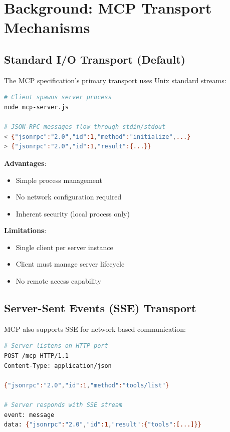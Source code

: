 \documentclass[11pt,letterpaper]{article}
\begin{document}
\section{Background: MCP Transport Mechanisms}

\subsection{Standard I/O Transport (Default)}

The MCP specification's primary transport uses Unix standard streams:

\begin{lstlisting}[language=bash,caption={Stdio MCP Communication}]
# Client spawns server process
node mcp-server.js

# JSON-RPC messages flow through stdin/stdout
< {"jsonrpc":"2.0","id":1,"method":"initialize",...}
> {"jsonrpc":"2.0","id":1,"result":{...}}
\end{lstlisting}

\textbf{Advantages}:
\begin{itemize}[noitemsep]
    \item Simple process management
    \item No network configuration required
    \item Inherent security (local process only)
\end{itemize}

\textbf{Limitations}:
\begin{itemize}[noitemsep]
    \item Single client per server instance
    \item Client must manage server lifecycle
    \item No remote access capability
\end{itemize}

\subsection{Server-Sent Events (SSE) Transport}

MCP also supports SSE for network-based communication:

\begin{lstlisting}[language=bash,caption={SSE MCP Communication}]
# Server listens on HTTP port
POST /mcp HTTP/1.1
Content-Type: application/json

{"jsonrpc":"2.0","id":1,"method":"tools/list"}

# Server responds with SSE stream
event: message
data: {"jsonrpc":"2.0","id":1,"result":{"tools":[...]}}
\end{lstlisting}
\end{document}
